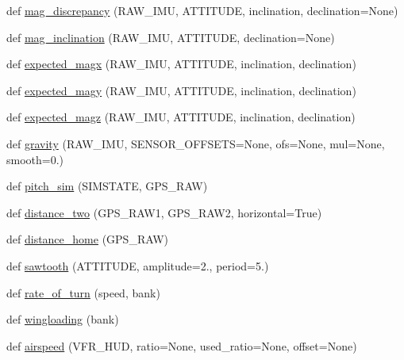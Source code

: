 \begin{DoxyCompactItemize}
\item 
def \hyperlink{namespacepymavlink_1_1mavextra_aaae8d1963031a79098cf818d480e0756}{mag\+\_\+discrepancy} (R\+A\+W\+\_\+\+I\+MU, A\+T\+T\+I\+T\+U\+DE, inclination, declination=None)
\item 
def \hyperlink{namespacepymavlink_1_1mavextra_a38cfb9a7f119e04fd6abee84eaca3adc}{mag\+\_\+inclination} (R\+A\+W\+\_\+\+I\+MU, A\+T\+T\+I\+T\+U\+DE, declination=None)
\item 
def \hyperlink{namespacepymavlink_1_1mavextra_aebb19fbb4880427930fb3c19ec91b01d}{expected\+\_\+magx} (R\+A\+W\+\_\+\+I\+MU, A\+T\+T\+I\+T\+U\+DE, inclination, declination)
\item 
def \hyperlink{namespacepymavlink_1_1mavextra_a961c101c8246849d791424520b2439e7}{expected\+\_\+magy} (R\+A\+W\+\_\+\+I\+MU, A\+T\+T\+I\+T\+U\+DE, inclination, declination)
\item 
def \hyperlink{namespacepymavlink_1_1mavextra_a9c3e49062cce7a6cf181d0ed8a0e0692}{expected\+\_\+magz} (R\+A\+W\+\_\+\+I\+MU, A\+T\+T\+I\+T\+U\+DE, inclination, declination)
\item 
def \hyperlink{namespacepymavlink_1_1mavextra_a762c44817d971674ece6d3c0cd90eedd}{gravity} (R\+A\+W\+\_\+\+I\+MU, S\+E\+N\+S\+O\+R\+\_\+\+O\+F\+F\+S\+E\+TS=None, ofs=None, mul=None, smooth=0.)
\item 
def \hyperlink{namespacepymavlink_1_1mavextra_a600c961891b95309d492b08f957d1bf4}{pitch\+\_\+sim} (S\+I\+M\+S\+T\+A\+TE, G\+P\+S\+\_\+\+R\+AW)
\item 
def \hyperlink{namespacepymavlink_1_1mavextra_a3bab8b877b7cecdc6fbece56106fd74a}{distance\+\_\+two} (G\+P\+S\+\_\+\+R\+A\+W1, G\+P\+S\+\_\+\+R\+A\+W2, horizontal=True)
\item 
def \hyperlink{namespacepymavlink_1_1mavextra_a263fad301c730511059b3c9bb58248d8}{distance\+\_\+home} (G\+P\+S\+\_\+\+R\+AW)
\item 
def \hyperlink{namespacepymavlink_1_1mavextra_a4a70f6c6e6d7fa829901749b7e3d5546}{sawtooth} (A\+T\+T\+I\+T\+U\+DE, amplitude=2., period=5.)
\item 
def \hyperlink{namespacepymavlink_1_1mavextra_a4d7617fb1541d638db0023fd663c59fd}{rate\+\_\+of\+\_\+turn} (speed, bank)
\item 
def \hyperlink{namespacepymavlink_1_1mavextra_abe7eb91429847abe6333b64f2fa5b39e}{wingloading} (bank)
\item 
def \hyperlink{namespacepymavlink_1_1mavextra_a769a373b481f0c8aa24565a18f141e66}{airspeed} (V\+F\+R\+\_\+\+H\+UD, ratio=None, used\+\_\+ratio=None, offset=None)

\end{DoxyCompactItemize}

